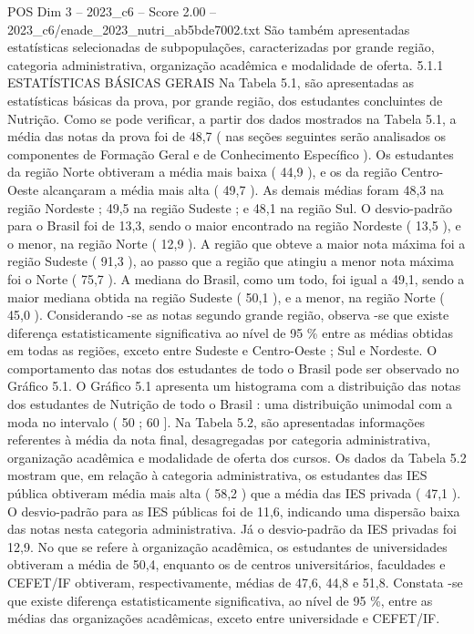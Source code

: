 \begin{textsample}{POS Dim 3 – 2023\_c6 – Score 2.00 – 2023\_c6/enade\_2023\_nutri\_ab5bde7002.txt}
São também apresentadas estatísticas selecionadas de subpopulações, caracterizadas por grande região, categoria administrativa, organização acadêmica e modalidade de oferta. 5.1.1 ESTATÍSTICAS BÁSICAS GERAIS Na Tabela 5.1, são apresentadas as estatísticas básicas da prova, por grande região, dos estudantes concluintes de Nutrição.
Como se pode verificar, a partir dos dados mostrados na Tabela 5.1, a média das notas da prova foi de 48,7 ( nas seções seguintes serão analisados os componentes de Formação Geral e de Conhecimento Específico ).
Os estudantes da região Norte obtiveram a média mais baixa ( 44,9 ), e os da região Centro-Oeste alcançaram a média mais alta ( 49,7 ).
As demais médias foram 48,3 na região Nordeste ; 49,5 na região Sudeste ; e 48,1 na região Sul.
O desvio-padrão para o Brasil foi de 13,3, sendo o maior encontrado na região Nordeste ( 13,5 ), e o menor, na região Norte ( 12,9 ).
A região que obteve a maior nota máxima foi a região Sudeste ( 91,3 ), ao passo que a região que atingiu a menor nota máxima foi o Norte ( 75,7 ).
A mediana do Brasil, como um todo, foi igual a 49,1, sendo a maior mediana obtida na região Sudeste ( 50,1 ), e a menor, na região Norte ( 45,0 ).
Considerando -se as notas segundo grande região, observa -se que existe diferença estatisticamente significativa ao nível de 95 \% entre as médias obtidas em todas as regiões, exceto entre Sudeste e Centro-Oeste ; Sul e Nordeste.
O comportamento das notas dos estudantes de todo o Brasil pode ser observado no Gráfico 5.1.
O Gráfico 5.1 apresenta um histograma com a distribuição das notas dos estudantes de Nutrição de todo o Brasil : uma distribuição unimodal com a moda no intervalo ( 50 ; 60 ].
Na Tabela 5.2, são apresentadas informações referentes à média da nota final, desagregadas por categoria administrativa, organização acadêmica e modalidade de oferta dos cursos.
Os dados da Tabela 5.2 mostram que, em relação à categoria administrativa, os estudantes das IES pública obtiveram média mais alta ( 58,2 ) que a média das IES privada ( 47,1 ).
O desvio-padrão para as IES públicas foi de 11,6, indicando uma dispersão baixa das notas nesta categoria administrativa.
Já o desvio-padrão da IES privadas foi 12,9.
No que se refere à organização acadêmica, os estudantes de universidades obtiveram a média de 50,4, enquanto os de centros universitários, faculdades e CEFET/IF obtiveram, respectivamente, médias de 47,6, 44,8 e 51,8.
Constata -se que existe diferença estatisticamente significativa, ao nível de 95 \%, entre as médias das organizações acadêmicas, exceto entre universidade e CEFET/IF.

\end{textsample}
